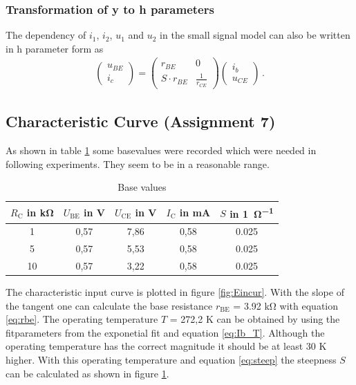 \documentclass[11pt, a4paper]{article}
\begin{document}
\subsubsection{Transformation of y to h parameters}
The dependency of $i_1$, $i_2$, $u_1$ and $u_2$ in the small signal model can also be written in h parameter form as
\begin{align}
    \begin{pmatrix}
        u_{BE} \\
        i_c
    \end{pmatrix}
    = 
    \begin{pmatrix}
        r_{BE} & 0 \\
        S \cdot r_{BE} & \frac{1}{r_{CE}}
    \end{pmatrix}
    \begin{pmatrix}
        i_b \\
        u_{CE}
    \end{pmatrix} \,.
\end{align}




\subsection{Characteristic Curve (Assignment 7)}
As shown in table \ref{tab:operating point_measurement} some basevalues were recorded which were needed in following experiments. They seem to be in a reasonable range.

\begin{table}[H]
    \centering
    \begin{tabular}{c|c|c|c|c}
    
        $R_{\text{C}}$ in \si{\kilo\ohm}  & $U_{\text{BE}}$ in \si{\volt} & $U_{\text{CE}}$ in \si{\volt} & $I_{\text{C}}$ in \si{\milli\ampere} & $S$ in \si{1\per\ohm} \\ \hline
        1 & 0,57 & 7,86 & 0,58 & 0.025\\ 
        5 & 0,57 & 5,53 & 0,58 & 0.025\\ 
        10 & 0,57 & 3,22 & 0,58 & 0.025\\ 
    \end{tabular}
    \label{tab:operating point_measurement}
    \caption{Base values}
\end{table}

The characteristic input curve is plotted in figure \ref{fig:Eincur}. With the slope of the tangent one can calculate the base resistance $r_{\text{BE}}$ = 3.92 \si{\kilo\ohm} with equation \ref{eq:rbe}. 
The operating temperature $T$ = 272,2 \si{\kelvin} can be obtained by using the fitparameters from the exponetial fit and equation \ref{eq:Ib_T}. Although the operating temperature has the correct magnitude it should be at least 30 \si{\kelvin} higher.
With this operating temperature and equation \ref{eq:steep} the steepness $S$ can be calculated as shown in figure \ref{tab:operating point_measurement}.
\end{document}
